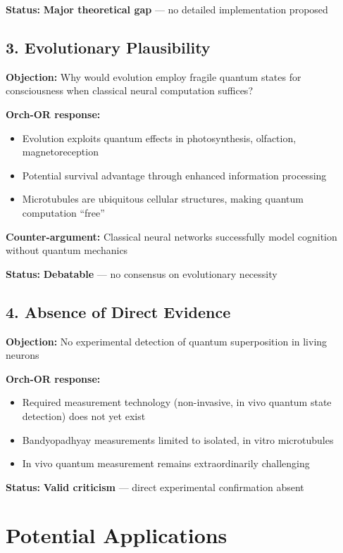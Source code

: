 \textbf{Status:} \textbf{Major theoretical gap} --- no detailed implementation proposed

\subsection{3. Evolutionary Plausibility}

\textbf{Objection:} Why would evolution employ fragile quantum states for consciousness when classical neural computation suffices?

\textbf{Orch-OR response:}
\begin{itemize}
\item Evolution exploits quantum effects in photosynthesis, olfaction, magnetoreception
\item Potential survival advantage through enhanced information processing
\item Microtubules are ubiquitous cellular structures, making quantum computation ``free''
\end{itemize}

\textbf{Counter-argument:} Classical neural networks successfully model cognition without quantum mechanics

\textbf{Status:} \textbf{Debatable} --- no consensus on evolutionary necessity

\subsection{4. Absence of Direct Evidence}

\textbf{Objection:} No experimental detection of quantum superposition in living neurons

\textbf{Orch-OR response:}
\begin{itemize}
\item Required measurement technology (non-invasive, in vivo quantum state detection) does not yet exist
\item Bandyopadhyay measurements limited to isolated, in vitro microtubules
\item In vivo quantum measurement remains extraordinarily challenging
\end{itemize}

\textbf{Status:} \textbf{Valid criticism} --- direct experimental confirmation absent

\section{Potential Applications}

